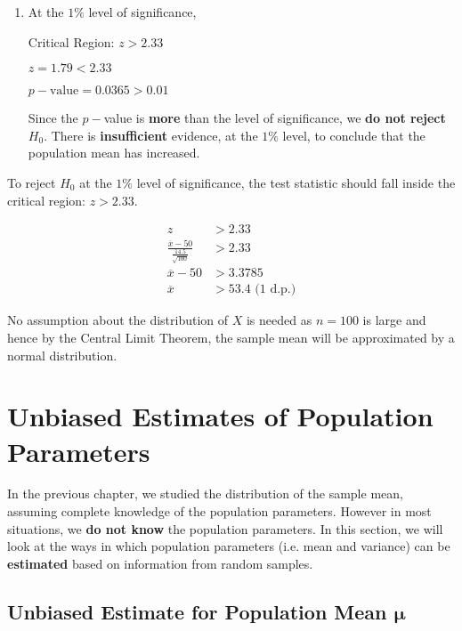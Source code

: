\documentclass[11pt,a4paper]{book}
\begin{document}
\begin{example}
\begin{enumerate}[label=(\alph*)]
\item  At the $1\%$ level of significance,

Critical Region: $z>2.33$

$z=1.79<2.33$

$p-\text{value}=0.0365>0.01$

\begin{tcolorbox}[colback=white, colframe=black,boxrule=.4pt, sharpish corners]

Since the $p-$value is \textbf{more} than the level of significance,
we \textbf{do not reject} $H_{0}$. There is \textbf{insufficient}
evidence, at the $1\%$ level, to conclude that the population mean
has increased.
\end{tcolorbox}

\end{enumerate}

To reject $H_{0}$ at the $1\%$ level of significance, the test statistic
should fall inside the critical region: $z>2.33$.

\begin{align*}
{\displaystyle z} & >2.33\\
\frac{\overline{x}-50}{\frac{14.5}{\sqrt{100}}} & >2.33\\
\overline{x}-50 & >3.3785\\
\overline{x} & >53.4\text{ (1 d.p.)}
\end{align*}

No assumption about the distribution of $X$ is needed as $n=100$
is large and hence by the Central Limit Theorem, the sample mean will
be approximated by a normal distribution.

\end{example}

\section{Unbiased Estimates of Population Parameters}

In the previous chapter, we studied the distribution of the sample
mean, assuming complete knowledge of the population parameters. However
in most situations, we\textbf{ do not know} the population parameters.
In this section, we will look at the ways in which population parameters
(i.e. mean and variance) can be \textbf{estimated} based on information
from random samples.

\subsection{Unbiased Estimate for Population Mean $\boldsymbol{\mu}$}
\end{document}
